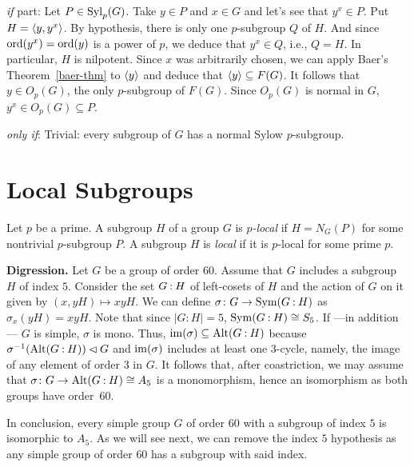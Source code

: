 \begin{solution}
\begin{description}
    \item{\rm{\it if\/} part:} Let $P\in{\rm Syl}_p(G)$. Take $y\in P$ and $x\in G$ and let's see that $y^x\in P$. Put $H=\langle y,y^x\rangle$. By hypothesis, there is only one $p$-subgroup $Q$ of $H$. And since ${\rm ord}(y^x)={\rm ord}(y)$ is a power of $p$, we deduce that $y^x\in Q$, i.e., $Q=H$. In particular, $H$ is nilpotent. Since $x$ was arbitrarily chosen, we can apply Baer's Theorem~\ref{baer-thm} to $\langle y\rangle$ and deduce that $\langle y\rangle\subseteq F(G)$. It follows that $y\in O_p(G)$, the only $p$-subgroup of $F(G)$. Since $O_p(G)$ is normal in $G$, $y^x\in O_p(G)\subseteq P$.
    
    \item{\rm{\it only if\/}:} Trivial: every subgroup of $G$ has a normal Sylow $p$-subgroup.
\end{description}
\end{solution}

\section{Local Subgroups}

\begin{defn}
    Let $p$ be a prime. A subgroup $H$ of a group $G$ is \textsl{$p$-local} if $H=N_G(P)$ for some nontrivial $p$-subgroup $P$. A subgroup $H$ is \textsl{local} if it is $p$-local for some prime $p$.
\end{defn}

\textbf{Digression.} Let\/ $G$ be a group of order\/ $60$. Assume that $G$ includes a subgroup\/ $H$ of index\/ $5$. Consider the set\/ $G\mathbin:H$ of left-cosets of\/ $H$ and the action of\/ $G$ on it given by\/ $(x,yH)\mapsto xyH$. We can define $\sigma\colon G\to{\rm Sym}(G\mathbin:H)$ as $\sigma_x(yH)=xyH$. Note that since $|G:H|=5$, ${\rm Sym}(G\mathbin:H)\cong S_5$. If ---in addition--- $G$ is simple, $\sigma$ is mono. Thus, $\operatorname{im}(\sigma)\subseteq{\rm Alt}(G\mathbin:H)$ because $\sigma^{-1}({\rm Alt}(G\mathbin:H))\lhd G$ and $\operatorname{im}(\sigma)$ includes at least one $3$-cycle, namely, the image of any element of order $3$ in $G$. It follows that, after coastriction, we may assume that $\sigma\colon G\to{\rm Alt}(G\mathbin:H)\cong A_5$ is a monomorphism, hence an isomorphism as both groups have order~$60$.

In conclusion, every simple group $G$ of order $60$ with a subgroup of index $5$ is isomorphic to $A_5$. As we will see next, we can remove the index $5$ hypothesis as any simple group of order $60$ has a subgroup with said index.

